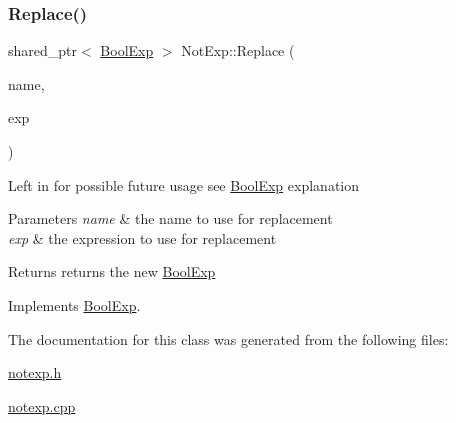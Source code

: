 \subsubsection{\texorpdfstring{Replace()}{Replace()}}
{\footnotesize\ttfamily shared\+\_\+ptr$<$ \mbox{\hyperlink{classBoolExp}{Bool\+Exp}} $>$ Not\+Exp\+::\+Replace (\begin{DoxyParamCaption}\item[{string}]{name,  }\item[{\mbox{\hyperlink{classBoolExp}{Bool\+Exp}} \&}]{exp }\end{DoxyParamCaption})\hspace{0.3cm}{\ttfamily [virtual]}}

Left in for possible future usage see \mbox{\hyperlink{classBoolExp}{Bool\+Exp}} explanation 
\begin{DoxyParams}{Parameters}
{\em name} & the name to use for replacement \\
\hline
{\em exp} & the expression to use for replacement \\
\hline
\end{DoxyParams}
\begin{DoxyReturn}{Returns}
returns the new \mbox{\hyperlink{classBoolExp}{Bool\+Exp}} 
\end{DoxyReturn}


Implements \mbox{\hyperlink{classBoolExp_a6448b7121c238759cc9cc8e48d6f8773}{Bool\+Exp}}.



The documentation for this class was generated from the following files\+:\begin{DoxyCompactItemize}
\item 
\mbox{\hyperlink{notexp_8h}{notexp.\+h}}\item 
\mbox{\hyperlink{notexp_8cpp}{notexp.\+cpp}}\end{DoxyCompactItemize}
